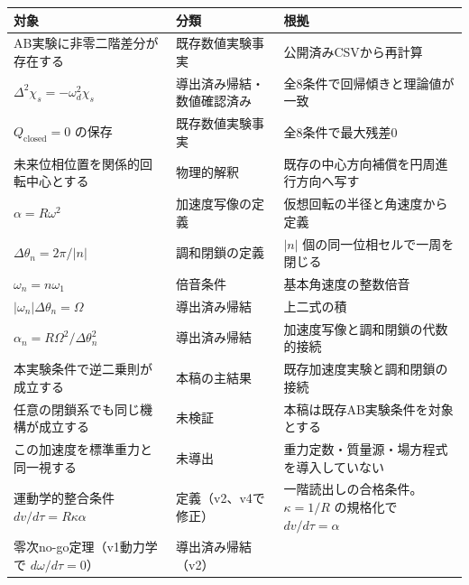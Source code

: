 \documentclass[
  a4paper,
]{ltjsarticle}
\newcounter{none} %
\begin{document}
{\def\LTcaptype{none} %
\begin{longtable}[]{@{}
  >{\raggedright\arraybackslash}p{}
  >{\raggedright\arraybackslash}p{}
  >{\raggedright\arraybackslash}p{}@{}}
\toprule\noalign{}
\begin{minipage}[b]{\linewidth}\raggedright
対象
\end{minipage} & \begin{minipage}[b]{\linewidth}\raggedright
分類
\end{minipage} & \begin{minipage}[b]{\linewidth}\raggedright
根拠
\end{minipage} \\
\midrule\noalign{}
\endhead
\bottomrule\noalign{}
\endlastfoot
AB実験に非零二階差分が存在する & 既存数値実験事実 &
公開済みCSVから再計算 \\
\(\Delta^2\chi_s=-\omega_d^2\chi_s\) & 導出済み帰結・数値確認済み &
全8条件で回帰傾きと理論値が一致 \\
\(Q_{\mathrm{closed}}=0\) の保存 & 既存数値実験事実 &
全8条件で最大残差0 \\
未来位相位置を関係的回転中心とする & 物理的解釈 &
既存の中心方向補償を円周進行方向へ写す \\
\(\alpha=R\omega^2\) & 加速度写像の定義 &
仮想回転の半径と角速度から定義 \\
\(\Delta\theta_n=2\pi/\lvert n\rvert\) & 調和閉鎖の定義 &
\(\lvert n\rvert\) 個の同一位相セルで一周を閉じる \\
\(\omega_n=n\omega_1\) & 倍音条件 & 基本角速度の整数倍音 \\
\(\lvert\omega_n\rvert\Delta\theta_n=\Omega\) & 導出済み帰結 &
上二式の積 \\
\(\alpha_n=R\Omega^2/\Delta\theta_n^2\) & 導出済み帰結 &
加速度写像と調和閉鎖の代数的接続 \\
本実験条件で逆二乗則が成立する & 本稿の主結果 &
既存加速度実験と調和閉鎖の接続 \\
任意の閉鎖系でも同じ機構が成立する & 未検証 &
本稿は既存AB実験条件を対象とする \\
この加速度を標準重力と同一視する & 未導出 &
重力定数・質量源・場方程式を導入していない \\
運動学的整合条件 \(dv/d\tau=R\kappa\alpha\) & 定義（v2、v4で修正） &
一階読出しの合格条件。\(\kappa=1/R\) の規格化で \(dv/d\tau=\alpha\) \\
零次no-go定理（v1動力学で \(d\omega/d\tau=0\)） & 導出済み帰結（v2） &

\end{longtable}}
\end{document}
